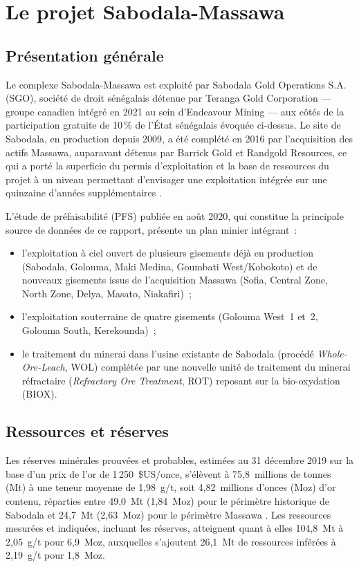 \section{Le projet Sabodala-Massawa}

\subsection{Présentation générale}

Le complexe Sabodala-Massawa est exploité par Sabodala Gold Operations S.A. (SGO), société de droit sénégalais détenue par Teranga Gold Corporation --- groupe canadien intégré en 2021 au sein d'Endeavour Mining --- aux côtés de la participation gratuite de 10\,\% de l'État sénégalais évoquée ci-dessus. Le site de Sabodala, en production depuis 2009, a été complété en 2016 par l'acquisition des actifs Massawa, auparavant détenus par Barrick Gold et Randgold Resources, ce qui a porté la superficie du permis d'exploitation et la base de ressources du projet à un niveau permettant d'envisager une exploitation intégrée sur une quinzaine d'années supplémentaires \citep{lycopodium2020pfs}.

L'étude de préfaisabilité (PFS) publiée en août 2020, qui constitue la principale source de données de ce rapport, présente un plan minier intégrant~:
\begin{itemize}
  \item l'exploitation à ciel ouvert de plusieurs gisements déjà en production (Sabodala, Golouma, Maki Medina, Goumbati West/Kobokoto) et de nouveaux gisements issus de l'acquisition Massawa (Sofia, Central Zone, North Zone, Delya, Masato, Niakafiri)~;
  \item l'exploitation souterraine de quatre gisements (Golouma West~1 et~2, Golouma South, Kerekounda)~;
  \item le traitement du minerai dans l'usine existante de Sabodala (procédé \emph{Whole-Ore-Leach}, WOL) complétée par une nouvelle unité de traitement du minerai réfractaire (\emph{Refractory Ore Treatment}, ROT) reposant sur la bio-oxydation (BIOX).
\end{itemize}

\subsection{Ressources et réserves}

Les réserves minérales prouvées et probables, estimées au 31 décembre 2019 sur la base d'un prix de l'or de 1\,250~\$US/once, s'élèvent à 75,8~millions de tonnes (Mt) à une teneur moyenne de 1,98~g/t, soit 4,82~millions d'onces (Moz) d'or contenu, réparties entre 49,0~Mt (1,84~Moz) pour le périmètre historique de Sabodala et 24,7~Mt (2,63~Moz) pour le périmètre Massawa \citep{lycopodium2020pfs}. Les ressources mesurées et indiquées, incluant les réserves, atteignent quant à elles 104,8~Mt à 2,05~g/t pour 6,9~Moz, auxquelles s'ajoutent 26,1~Mt de ressources inférées à 2,19~g/t pour 1,8~Moz.

